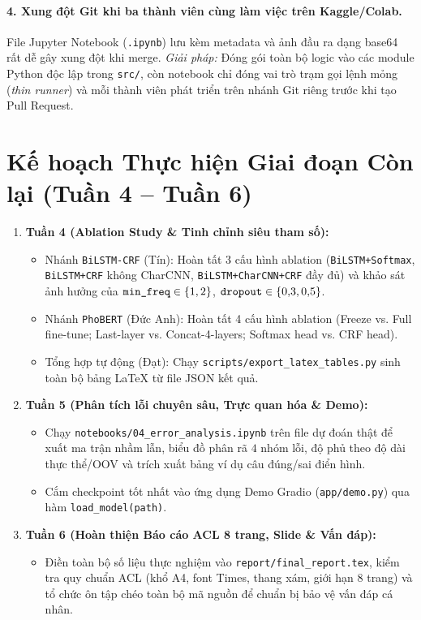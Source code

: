 \documentclass[11pt,a4paper,twocolumn]{article}
\begin{document}
\paragraph{4. Xung đột Git khi ba thành viên cùng làm việc trên Kaggle/Colab.}
File Jupyter Notebook (\texttt{.ipynb}) lưu kèm metadata và ảnh đầu ra dạng base64 rất dễ gây xung đột khi merge.
\textit{Giải pháp:} Đóng gói toàn bộ logic vào các module Python độc lập trong \texttt{src/}, còn notebook chỉ đóng vai trò trạm gọi lệnh mỏng (\textit{thin runner}) và mỗi thành viên phát triển trên nhánh Git riêng trước khi tạo Pull Request.

\section{Kế hoạch Thực hiện Giai đoạn Còn lại (Tuần 4 -- Tuần 6)}
\begin{enumerate}
  \item \textbf{Tuần 4 (Ablation Study \& Tinh chỉnh siêu tham số):}
    \begin{itemize}
      \item Nhánh \texttt{BiLSTM-CRF} (Tín): Hoàn tất 3 cấu hình ablation (\texttt{BiLSTM+Softmax}, \texttt{BiLSTM+CRF} không CharCNN, \texttt{BiLSTM+CharCNN+CRF} đầy đủ) và khảo sát ảnh hưởng của $\text{\texttt{min\_freq}} \in \{1, 2\}$, $\text{\texttt{dropout}} \in \{0{,}3, 0{,}5\}$.
      \item Nhánh \texttt{PhoBERT} (Đức Anh): Hoàn tất 4 cấu hình ablation (Freeze vs. Full fine-tune; Last-layer vs. Concat-4-layers; Softmax head vs. CRF head).
      \item Tổng hợp tự động (Đạt): Chạy \texttt{scripts/export\_latex\_tables.py} sinh toàn bộ bảng LaTeX từ file JSON kết quả.
    \end{itemize}
  \item \textbf{Tuần 5 (Phân tích lỗi chuyên sâu, Trực quan hóa \& Demo):}
    \begin{itemize}
      \item Chạy \texttt{notebooks/04\_error\_analysis.ipynb} trên file dự đoán thật để xuất ma trận nhầm lẫn, biểu đồ phân rã $4$ nhóm lỗi, độ phủ theo độ dài thực thể/OOV và trích xuất bảng ví dụ câu đúng/sai điển hình.
      \item Cắm checkpoint tốt nhất vào ứng dụng Demo Gradio (\texttt{app/demo.py}) qua hàm \texttt{load\_model(path)}.
    \end{itemize}
  \item \textbf{Tuần 6 (Hoàn thiện Báo cáo ACL 8 trang, Slide \& Vấn đáp):}
    \begin{itemize}
      \item Điền toàn bộ số liệu thực nghiệm vào \texttt{report/final\_report.tex}, kiểm tra quy chuẩn ACL (khổ A4, font Times, thang xám, giới hạn 8 trang) và tổ chức ôn tập chéo toàn bộ mã nguồn để chuẩn bị bảo vệ vấn đáp cá nhân.
    \end{itemize}
\end{enumerate}


\end{document}
